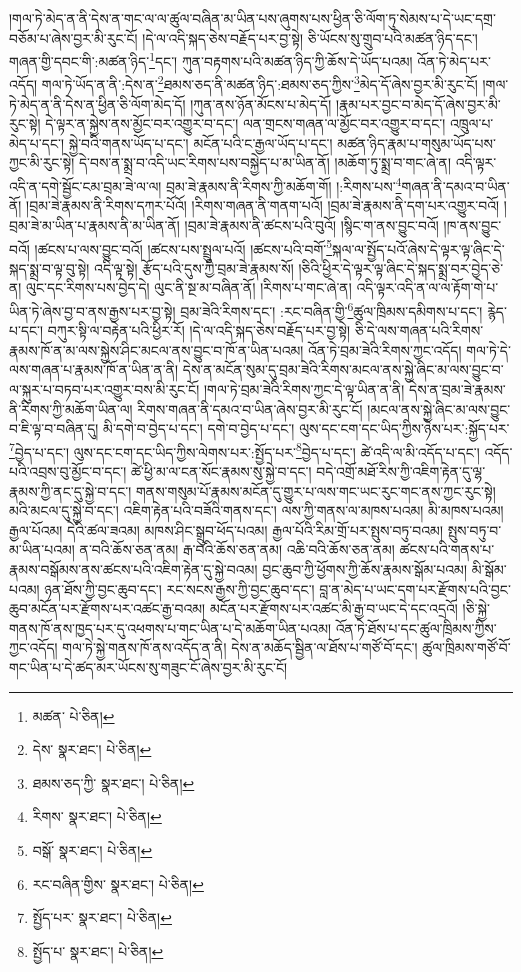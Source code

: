།གལ་ཏེ་མེད་ན་ནི་དེས་ན་གང་ལ་ལ་ཚུལ་བཞིན་མ་ཡིན་པས་ཞུགས་པས་ཕྱིན་ཅི་ལོག་ཏུ་སེམས་པ་དེ་ཡང་དགྲ་བཅོམ་པ་ཞེས་བྱར་མི་རུང་ངོ། །དེ་ལ་འདི་སྐད་ཅེས་བརྗོད་པར་བྱ་སྟེ། ཅི་ཡོངས་སུ་གྲུབ་པའི་མཚན་ཉིད་དང་། གཞན་གྱི་དབང་གི་:མཚན་ཉིད་\footnote{མཚན་  པེ་ཅིན། }དང་། ཀུན་བརྟགས་པའི་མཚན་ཉིད་ཀྱི་ཆོས་དེ་ཡོད་པའམ། འོན་ཏེ་མེད་པར་འདོད། གལ་ཏེ་ཡོད་ན་ནི་:དེས་ན་\footnote{དེས་  སྣར་ཐང་།  པེ་ཅིན། }ཐམས་ཅད་ནི་མཚན་ཉིད་:ཐམས་ཅད་ཀྱིས་\footnote{ཐམས་ཅད་ཀྱི་  སྣར་ཐང་།  པེ་ཅིན། }མེད་དོ་ཞེས་བྱར་མི་རུང་ངོ། །གལ་ཏེ་མེད་ན་ནི་དེས་ན་ཕྱིན་ཅི་ལོག་མེད་དོ། །ཀུན་ནས་ཉོན་མོངས་པ་མེད་དོ། །རྣམ་པར་བྱང་བ་མེད་དོ་ཞེས་བྱར་མི་རུང་སྟེ། དེ་ལྟར་ན་སྐྱེས་ནས་མྱོང་བར་འགྱུར་བ་དང་། ལན་གྲངས་གཞན་ལ་མྱོང་བར་འགྱུར་བ་དང་། འཁྲུལ་པ་མེད་པ་དང་། སྐྱེ་བའི་གནས་ཡོད་པ་དང་། མངོན་པའི་ང་རྒྱལ་ཡོད་པ་དང་། མཚན་ཉིད་རྣམ་པ་གསུམ་ཡོད་པས་ཀྱང་མི་རུང་སྟེ། དེ་བས་ན་སྨྲ་བ་འདི་ཡང་རིགས་པས་བསྐྱེད་པ་མ་ཡིན་ནོ། །མཆོག་ཏུ་སྨྲ་བ་གང་ཞེ་ན། འདི་ལྟར་འདི་ན་དགེ་སྦྱོང་ངམ་བྲམ་ཟེ་ལ་ལ། བྲམ་ཟེ་རྣམས་ནི་རིགས་ཀྱི་མཆོག་གོ། །:རིགས་པས་\footnote{རིགས་  སྣར་ཐང་།  པེ་ཅིན། }གཞན་ནི་དམའ་བ་ཡིན་ནོ། །བྲམ་ཟེ་རྣམས་ནི་རིགས་དཀར་པོའོ། །རིགས་གཞན་ནི་གནག་པའོ། །བྲམ་ཟེ་རྣམས་ནི་དག་པར་འགྱུར་བའོ། །བྲམ་ཟེ་མ་ཡིན་པ་རྣམས་ནི་མ་ཡིན་ནོ། །བྲམ་ཟེ་རྣམས་ནི་ཚངས་པའི་བུའོ། །སྙིང་ག་ནས་བྱུང་བའོ། །ཁ་ནས་བྱུང་བའོ། །ཚངས་པ་ལས་བྱུང་བའོ། །ཚངས་པས་སྤྲུལ་པའོ། །ཚངས་པའི་བགོ་\footnote{བསྒོ་  སྣར་ཐང་།  པེ་ཅིན། }སྐལ་ལ་སྤྱོད་པའོ་ཞེས་དེ་ལྟར་ལྟ་ཞིང་དེ་སྐད་སྨྲ་བ་ལྟ་བུ་སྟེ། འདི་ལྟ་སྟེ། རྩོད་པའི་དུས་ཀྱི་བྲམ་ཟེ་རྣམས་སོ། །ཅིའི་ཕྱིར་དེ་ལྟར་ལྟ་ཞིང་དེ་སྐད་སྨྲ་བར་བྱེད་ཅེ་ན། ལུང་དང་རིགས་པས་བྱེད་དེ། ལུང་ནི་སྔ་མ་བཞིན་ནོ། །རིགས་པ་གང་ཞེ་ན། འདི་ལྟར་འདི་ན་ལ་ལ་རྟོག་གེ་པ་ཡིན་ཏེ་ཞེས་བྱ་བ་ནས་རྒྱས་པར་བྱ་སྟེ། བྲམ་ཟེའི་རིགས་དང་། :རང་བཞིན་གྱི་\footnote{རང་བཞིན་གྱིས་  སྣར་ཐང་།  པེ་ཅིན། }ཚུལ་ཁྲིམས་དམིགས་པ་དང་། རྙེད་པ་དང་། བཀུར་སྟི་ལ་བརྟེན་པའི་ཕྱིར་རོ། །དེ་ལ་འདི་སྐད་ཅེས་བརྗོད་པར་བྱ་སྟེ། ཅི་དེ་ལས་གཞན་པའི་རིགས་རྣམས་ཁོ་ན་མ་ལས་སྐྱེས་ཤིང་མངལ་ནས་བྱུང་བ་ཁོ་ན་ཡིན་པའམ། འོན་ཏེ་བྲམ་ཟེའི་རིགས་ཀྱང་འདོད། གལ་ཏེ་དེ་ལས་གཞན་པ་རྣམས་ཁོ་ན་ཡིན་ན་ནི། དེས་ན་མངོན་སུམ་དུ་བྲམ་ཟེའི་རིགས་མངལ་ནས་སྐྱེ་ཞིང་མ་ལས་བྱུང་བ་ལ་སྐུར་པ་བཏབ་པར་འགྱུར་བས་མི་རུང་ངོ། །གལ་ཏེ་བྲམ་ཟེའི་རིགས་ཀྱང་དེ་ལྟ་ཡིན་ན་ནི། དེས་ན་བྲམ་ཟེ་རྣམས་ནི་རིགས་ཀྱི་མཆོག་ཡིན་ལ། རིགས་གཞན་ནི་དམའ་བ་ཡིན་ཞེས་བྱར་མི་རུང་ངོ། །མངལ་ནས་སྐྱེ་ཞིང་མ་ལས་བྱུང་བ་ཇི་ལྟ་བ་བཞིན་དུ། མི་དགེ་བ་བྱེད་པ་དང་། དགེ་བ་བྱེད་པ་དང་། ལུས་དང་ངག་དང་ཡིད་ཀྱིས་ཉེས་པར་:སྐྱོད་པར་\footnote{སྤྱོད་པར་  སྣར་ཐང་།  པེ་ཅིན། }བྱེད་པ་དང་། ལུས་དང་ངག་དང་ཡིད་ཀྱིས་ལེགས་པར་:སྤྱོད་པར་\footnote{སྤྱོད་པ་  སྣར་ཐང་།  པེ་ཅིན། }བྱེད་པ་དང་། ཚེ་འདི་ལ་མི་འདོད་པ་དང་། འདོད་པའི་འབྲས་བུ་མྱོང་བ་དང་། ཚེ་ཕྱི་མ་ལ་ངན་སོང་རྣམས་སུ་སྐྱེ་བ་དང་། བདེ་འགྲོ་མཐོ་རིས་ཀྱི་འཇིག་རྟེན་དུ་ལྷ་རྣམས་ཀྱི་ནང་དུ་སྐྱེ་བ་དང་། གནས་གསུམ་པོ་རྣམས་མངོན་དུ་གྱུར་པ་ལས་གང་ཡང་རུང་གང་ནས་ཀྱང་རུང་སྟེ། མའི་མངལ་དུ་སྐྱེ་བ་དང་། འཇིག་རྟེན་པའི་བཟོའི་གནས་དང་། ལས་ཀྱི་གནས་ལ་མཁས་པའམ། མི་མཁས་པའམ། རྒྱལ་པོའམ། དེའི་ཚལ་ཟའམ། མཁས་ཤིང་སྒྲུབ་ཕོད་པའམ། རྒྱལ་པོའི་རིམ་གྲོ་པར་སྤུས་བཏུ་བའམ། སྤུས་བཏུ་བ་མ་ཡིན་པའམ། ན་བའི་ཆོས་ཅན་ནམ། རྒ་བའི་ཆོས་ཅན་ནམ། འཆི་བའི་ཆོས་ཅན་ནམ། ཚངས་པའི་གནས་པ་རྣམས་བསྒོམས་ནས་ཚངས་པའི་འཇིག་རྟེན་དུ་སྐྱེ་བའམ། བྱང་ཆུབ་ཀྱི་ཕྱོགས་ཀྱི་ཆོས་རྣམས་སྒོམ་པའམ། མི་སྒོམ་པའམ། ཉན་ཐོས་ཀྱི་བྱང་ཆུབ་དང་། རང་སངས་རྒྱས་ཀྱི་བྱང་ཆུབ་དང་། བླ་ན་མེད་པ་ཡང་དག་པར་རྫོགས་པའི་བྱང་ཆུབ་མངོན་པར་རྫོགས་པར་འཚང་རྒྱ་བའམ། མངོན་པར་རྫོགས་པར་འཚང་མི་རྒྱ་བ་ཡང་དེ་དང་འདྲའོ། །ཅི་སྐྱེ་གནས་ཁོ་ནས་ཁྱད་པར་དུ་འཕགས་པ་གང་ཡིན་པ་དེ་མཆོག་ཡིན་པའམ། འོན་ཏེ་ཐོས་པ་དང་ཚུལ་ཁྲིམས་ཀྱིས་ཀྱང་འདོད། གལ་ཏེ་སྐྱེ་གནས་ཁོ་ནས་འདོད་ན་ནི། དེས་ན་མཆོད་སྦྱིན་ལ་ཐོས་པ་གཙོ་བོ་དང་། ཚུལ་ཁྲིམས་གཙོ་བོ་གང་ཡིན་པ་དེ་ཚད་མར་ཡོངས་སུ་གཟུང་ངོ་ཞེས་བྱར་མི་རུང་ངོ། 